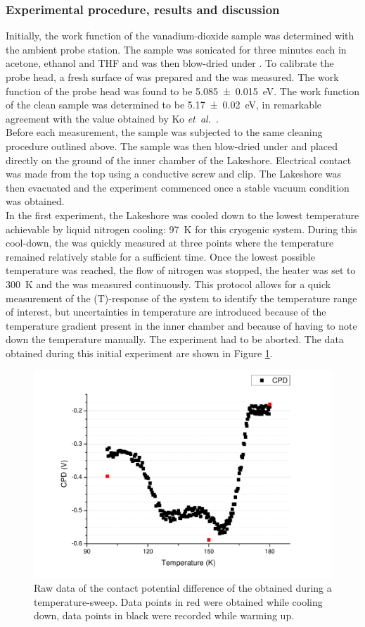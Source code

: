 \subsubsection{Experimental procedure, results and discussion}
Initially, the work function of the vanadium-dioxide sample was determined with the ambient probe station. The sample was sonicated for three minutes each in acetone, ethanol and THF and was then blow-dried under \nitro{}. To calibrate the probe head, a fresh surface of \hopg{} was prepared and the \cpd{} was measured. The work function of the probe head was found to be \SI{5.085+-0.015}{\electronvolt}. The work function of the clean \wvadiox{} sample was determined to be \SI{5.17+-0.02}{\electronvolt}, in remarkable agreement with the value obtained by Ko \emph{et~al.}~\cite{ko_kp}.\\
Before each measurement, the sample was subjected to the same cleaning procedure outlined above. The sample was then blow-dried under \nitro{} and placed directly on the ground of the inner chamber of the Lakeshore. Electrical contact was made from the top using a conductive screw and clip. The Lakeshore was then evacuated and the experiment commenced once a stable vacuum condition was obtained.\\
In the first experiment, the Lakeshore was cooled down to the lowest temperature achievable by liquid nitrogen cooling: \SI{97}{\kelvin} for this cryogenic system. During this cool-down, the \cpd{} was quickly measured at three points where the temperature remained relatively stable for a sufficient time. Once the lowest possible temperature was reached, the flow of nitrogen was stopped, the heater was set to \SI{300}{\kelvin} and the \cpd{} was measured continuously. This protocol allows for a quick measurement of the \cpd{}(T)-response of the system to identify the temperature range of interest, but uncertainties in temperature are introduced because of the temperature gradient present in the inner chamber and because of having to note down the temperature manually. The experiment had to be aborted. The data obtained during this initial experiment are shown in Figure \ref{fig:vox1}.\\
\begin{figure}
\centering
	\includegraphics[width=0.8\linewidth]{./figs/vox1}
	\caption{Raw data of the contact potential difference of the \wvadiox{} obtained during a temperature-sweep. Data points in red were obtained while cooling down, data points in black were recorded while warming up.}
	\label{fig:vox1}
\end{figure}
